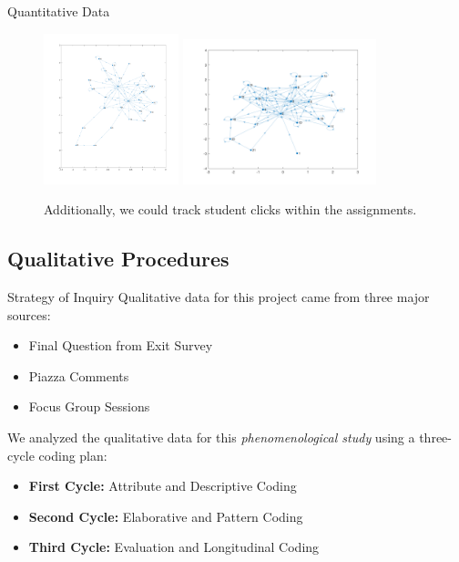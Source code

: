\documentclass[xcolor=x11names,compress]{beamer}
\begin{document}
\begin{frame}{Quantitative Data}
	\begin{figure}
		\centering
		\includegraphics[width=0.35\textwidth]{img/matlab_example_1.png}
		\includegraphics[width=0.50\textwidth]{img/matlab_example_2.png}
		\caption{Additionally, we could track student clicks within the assignments.}
		\label{fig:matlab_examples}
	\end{figure}
\end{frame}

\subsection{Qualitative Procedures}

\begin{frame}{Strategy of Inquiry}
	Qualitative data for this project came from three major sources:
	\vspace{1mm}
	\begin{itemize}
		\item Final Question from Exit Survey
		\item Piazza Comments
		\item Focus Group Sessions
	\end{itemize}
	\vspace{5mm}
	We analyzed the qualitative data for this \textit{phenomenological study} using a three-cycle coding plan:
	\vspace{1mm}
	\begin{itemize}
		\item \textbf{First Cycle:} Attribute and Descriptive Coding
		\item \textbf{Second Cycle:} Elaborative and Pattern Coding
		\item \textbf{Third Cycle:} Evaluation and Longitudinal Coding
	\end{itemize}
\end{frame}
\end{document}
